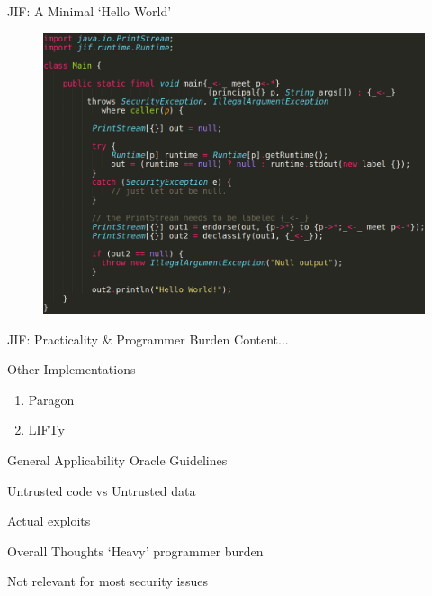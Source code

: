 \begin{frame}{JIF: A Minimal `Hello World'}
	\begin{figure}
		\includegraphics[width=\linewidth]{content/images/jif_helloworld.png}
	\end{figure}
\end{frame}

\begin{frame}{JIF: Practicality \& Programmer Burden}
	Content...
\end{frame}

\begin{frame}{Other Implementations}
	\begin{enumerate}
		\item Paragon
		\item LIFTy
	\end{enumerate}
\end{frame}

\begin{frame}{General Applicability}
	Oracle Guidelines
	
	Untrusted code vs Untrusted data
	
	Actual exploits
\end{frame}

\begin{frame}{Overall Thoughts}
	`Heavy' programmer burden
	
	Not relevant for most security issues
\end{frame}